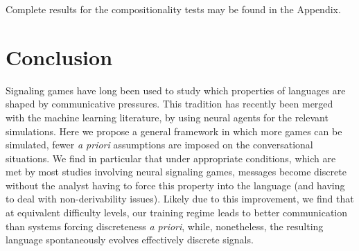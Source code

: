 \documentclass[11pt,a4paper]{article}
\newcommand{\nbEC}[1]{{\leavevmode\color{blue}{\scriptsize#1}}}
\newcommand{\nbSST}[1]{{\leavevmode\color{violet}{\scriptsize#1}}}
\begin{document}
Complete results for the compositionality tests may be found in the Appendix.
\nbSST{Nur: see appendix.tex}




\section{Conclusion}

Signaling games have long been used to study which properties of languages are shaped by communicative pressures. This tradition has recently been merged with the machine learning literature, by using neural agents for the relevant simulations. Here we propose a general framework in which more games can be simulated, fewer \emph{a priori} assumptions are imposed on the conversational situations. We find in particular that under appropriate conditions, which are met by most studies involving neural signaling games, messages become discrete without the analyst having to force this property into the language (and having to deal with non-derivability issues). Likely due to this improvement, we find that at equivalent difficulty levels, our training regime leads to better communication than systems forcing discreteness \emph{a priori}, while, nonetheless, the resulting language spontaneously evolves effectively discrete signals. 
\nbSST{As mentioned above, we can't directly compare our results to my old ones, so I think we'll need to re-word this.  I'll take a stab in a bit.}





\end{document}
